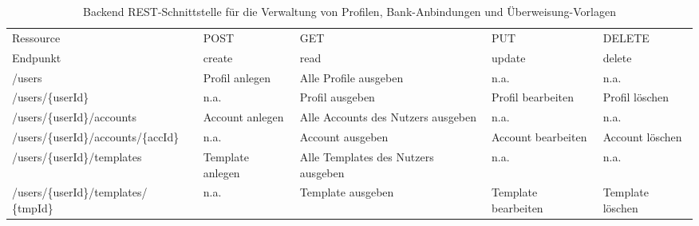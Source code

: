 \begin{table}[!h]
\centering
 \begin{tabular}{ | m{4.5cm} || C{2cm}| C{2cm} | C{2cm} | C{2cm} |} 
 \hline
 Ressource & POST & GET & PUT & DELETE\\ 
 Endpunkt & create & read & update & delete \\
 \hhline{=::====}
  /users & Profil anlegen & Alle Profile ausgeben & n.a. & n.a.\\ 
 \hline /users/\{userId\} & n.a. & Profil ausgeben & Profil bearbeiten & Profil löschen\\
 \hline /users/\{userId\}/accounts & Account anlegen & Alle Accounts des Nutzers ausgeben & n.a. & n.a.\\
 \hline /users/\{userId\}/accounts/\{accId\} & n.a. & Account ausgeben & Account bearbeiten & Account löschen\\
 \hline /users/\{userId\}/templates & Template anlegen & Alle Templates des Nutzers ausgeben & n.a. & n.a.\\ 
 \hline /users/\{userId\}/templates/
 \{tmpId\} & n.a. & Template ausgeben & Template bearbeiten & Template löschen\\ 
 \hline
\end{tabular}
\caption{Backend REST-Schnittstelle für die Verwaltung von Profilen, Bank-Anbindungen und Überweisung-Vorlagen}
\label{tab:backend-rest-api}
\end{table}

